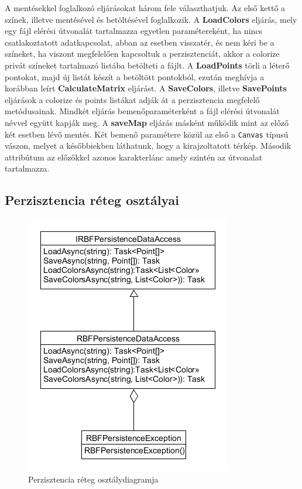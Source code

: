 			A mentésekkel foglalkozó eljárásokat három fele választhatjuk. Az első kettő a színek, illetve mentésével és betöltésével foglalkozik. A \textbf{LoadColors} eljárás, mely egy fájl elérési útvonalát tartalmazza egyetlen paramétereként, ha nincs csatlakoztatott adatkapcsolat, abban az esetben visszatér, és nem kéri be a színeket, ha viszont megfelelően kapcsoltuk a perzisztenciát, akkor a colorize privát színeket tartalmazó listába betölteti a fájlt. A \textbf{LoadPoints} törli a léterő pontokat, majd új listát készít a betöltött pontokból, ezután meghívja a korábban leírt \textbf{CalculateMatrix} eljárást. A \textbf{SaveColors}, illetve \textbf{SavePoints} eljárások a colorize és points listákat adják át a perzisztencia megfelelő metódusainak. Mindkét eljárás bemenőparaméterként a fájl elérési útvonalát névvel együtt kapják meg. A \textbf{saveMap} eljárás másként működik mint az előző két esetben lévő mentés. Két bemenő paramétere közül az első a \texttt{Canvas} típusú vászon, melyet a későbbiekben láthatunk, hogy a kirajzoltatott térkép. Második attribútum az előzőkkel azonos karakterlánc amely szintén az útvonalat tartalmazza. 
			
			
		
		\subsection{Perzisztencia réteg osztályai}
		
			\begin{figure}[ht]
				\centering
				\includegraphics[scale=0.7]{developer/Persistence.png}
				\caption{Perzisztencia réteg osztálydiagramja}
			\end{figure}
		
